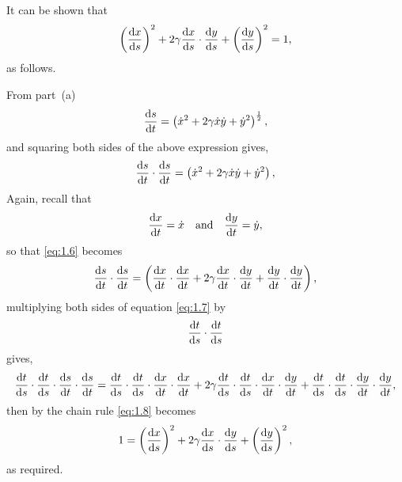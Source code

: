 It can be shown that
\begin{equation*}
\left(\frac{\mathrm{d}x}{\mathrm{d}s}\right)^2 + 2\gamma\frac{\mathrm{d}x}{\mathrm{d}s}\cdot\frac{\mathrm{d}y}{\mathrm{d}s} + \left(\frac{\mathrm{d}y}{\mathrm{d}s}\right)^2 = 1,
\end{equation*}
as follows.

From part~(a)
\begin{equation*}
	\frac{\mathrm{d}s}{\mathrm{d}t} = \left(\dot{x}^2 + 2\gamma\dot{x}\dot{y} + \dot{y}^2\right)^{\frac{1}{2}},
\end{equation*}
and squaring both sides of the above expression gives,
\begin{equation}
	\label{eq:1.6}
	\deriv{s}{t} \cdot \deriv{s}{t}= \lr{\xd^2 + 2\gamma\xd\yd + \yd^2},
\end{equation}
Again, recall that
\begin{equation*}
	\frac{\mathrm{d}x}{\mathrm{d}t} = \dot{x} \quad \textrm{and} \quad \frac{\mathrm{d}y}{\mathrm{d}t} = \dot{y},
\end{equation*}
so that \eqref{eq:1.6} becomes
\begin{equation}
	\label{eq:1.7}
	\deriv{s}{t} \cdot \deriv{s}{t}= \lr{\deriv{x}{t}\cdot\deriv{x}{t} + 2\gamma\deriv{x}{t}\cdot\deriv{y}{t} + \deriv{y}{t}\cdot\deriv{y}{t}},
\end{equation}
multiplying both sides of equation \eqref{eq:1.7} by
\[
	\frac{\mathrm{d}t}{\mathrm{d}s}\cdot\frac{\mathrm{d}t}{\mathrm{d}s}
\]
gives,
\begin{equation}
	\label{eq:1.8}
	\deriv{t}{s}\cdot\deriv{t}{s}\cdot\deriv{s}{t} \cdot \deriv{s}{t}= \deriv{t}{s}\cdot\deriv{t}{s}\cdot\deriv{x}{t}\cdot\deriv{x}{t} + 2\gamma\deriv{t}{s}\cdot\deriv{t}{s}\cdot\deriv{x}{t}\cdot\deriv{y}{t} + \deriv{t}{s}\cdot\deriv{t}{s}\cdot\deriv{y}{t}\cdot\deriv{y}{t},
\end{equation}
then by the chain rule \eqref{eq:1.8} becomes
\begin{equation}
\label{eq:1.9}
	1 = \lr{\deriv{x}{s}}^2 + 2\gamma\deriv{x}{s}\cdot\deriv{y}{s} + \lr{\deriv{y}{s}}^2,
\end{equation}
as required.
